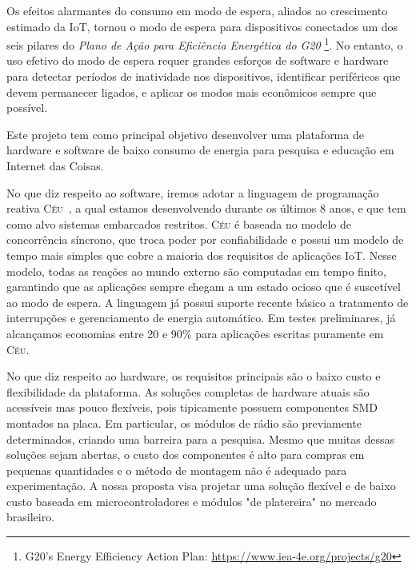 \documentclass[titlepage,12pt]{article}
\newcommand{\CEU}{\textsc{C\'{e}u}\xspace}
\begin{document}
Os efeitos alarmantes do consumo em modo de espera, aliados ao crescimento
estimado da IoT, tornou o modo de espera para dispositivos conectados um dos
seis pilares do \emph{Plano de Ação para Eficiência Energética do G20}%
\footnote{G20's Energy Efficiency Action Plan: \url{https://www.iea-4e.org/projects/g20}}.
No entanto, o uso efetivo do modo de espera requer grandes esforços de software
e hardware para detectar períodos de inatividade nos dispositivos, identificar
periféricos que devem permanecer ligados, e aplicar os modos mais econômicos
sempre que possível.

Este projeto tem como principal objetivo desenvolver uma plataforma de hardware
e software de baixo consumo de energia para pesquisa e educação em Internet das
Coisas.

No que diz respeito ao software, iremos adotar a linguagem de programação
reativa \CEU~\cite{ceu.sensys13}, a qual estamos desenvolvendo durante os
últimos 8 anos, e que tem como alvo sistemas embarcados restritos.
%
\CEU é baseada no modelo de concorrência síncrono, que troca poder por
confiabilidade e possui um modelo de tempo mais simples que cobre a maioria dos
requisitos de aplicações IoT.
%
Nesse modelo, todas as reações ao mundo externo são computadas em tempo finito,
garantindo que as aplicações sempre chegam a um estado ocioso que é suscetível
ao modo de espera.
%
A linguagem já possui suporte recente básico a tratamento de interrupções e
gerenciamento de energia automático.
Em testes preliminares, já alcançamos economias entre 20 e 90\% para aplicações
escritas puramente em \CEU.

No que diz respeito ao hardware, os requisitos principais são o baixo custo e
flexibilidade da plataforma.
%
As soluções completas de hardware atuais são acessíveis mas pouco flexíveis,
pois tipicamente possuem componentes SMD montados na placa.
Em particular, os módulos de rádio são previamente determinados, criando uma
barreira para a pesquisa.
Mesmo que muitas dessas soluções sejam abertas, o custo dos componentes é alto
para compras em pequenas quantidades e o método de montagem não é adequado para
experimentação.
%
A nossa proposta visa projetar uma solução flexível e de baixo custo baseada em
microcontroladores e módulos "de platereira" no mercado brasileiro.

\end{document}
